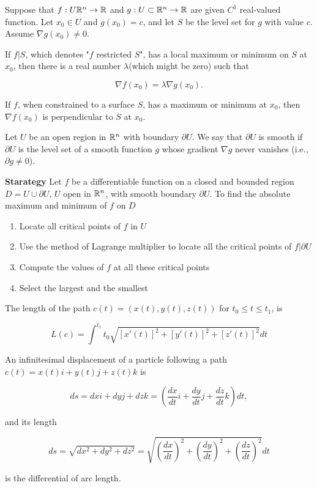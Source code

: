 \begin{thm*}
	Suppose that $f: U \mathbb{R}^n \rightarrow \mathbb{R}$ and $g: U \subset \mathbb{R}^n \rightarrow \mathbb{R}$ are given $C^1$ real-valued function. Let $x_0 \in U$ and $g(x_0) = c$, and let $S$ be the level set for $g$ with value $c$. Assume $\nabla g(x_0) \neq 0$.
	
	If $f|S$, which denotes "$f$ restricted $S$", has a local maximum or minimum on $S$ at $x_0$, then there is a real number $\lambda$(which might be zero) such that
	
	$$\nabla f(x_0) = \lambda \nabla g (x_0).$$	
\end{thm*}


\begin{thm*}
	If $f$, when constrained to a surface $S$, has a maximum or minimum at $x_0$, then $\nabla f(x_0)$ is perpendicular to $S$ at $x_0$.	
\end{thm*}


\begin{defn}
	Let $U$ be an open region in $\mathbb{R}^n$ with boundary $\partial U$. We say that $\partial U$ is smooth if $\partial U$ is the level set of a smooth function $g$ whose gradient $\nabla g$ never vanishes (i.e., $\partial g \neq 0$).	
\end{defn}

\textbf{Starategy} Let $f$ be a differentiable function on a closed and bounded region $D = U \cup \partial U$, $U$ open in $\mathbb{R}^n$, with smooth boundary $\partial U$. To find the absolute maximum and minimum of $f$ on $D$

\begin{enumerate}[wide, label = $\roman*)$]
	\item	Locate all critical points of $f$ in $U$
	\item Use the method of Lagrange multiplier to locate all the critical points of $f|\partial U$
	\item Compute the values of $f$ at all these critical points
	\item Select the largest and the smallest
\end{enumerate}

\begin{defn}
	The length of the path $c(t) = (x(t),y(t),z(t))$ for $t_0 \leq t \leq t_1$, is 
	
	$$L(c) = \int^{t_1}{t_0}\sqrt{[x'(t)]^2 + [y'(t)]^2 + [z'(t)]^2}dt$$	
\end{defn}

\begin{defn}
	An infinitesimal displacement of a particle following a path $c(t) = x(t)i + y(t)j + z(t)k$ is 
	
	$$ds = dxi + dyj + dzk = \left(\dfrac{dx}{dt}i + \dfrac{dy}{dt}j + \dfrac{dz}{dt}k\right) dt,$$
	
	and its length
	
	$$ds = \sqrt{dx^2 + dy^2 + dz^2} = \sqrt{\left( \dfrac{dx}{dt}\right)^2 + \left( \dfrac{dy}{dt}\right)^2 + \left( \dfrac{dz}{dt}\right)^2}dt$$
	
	is the differential of arc length.	
\end{defn}


